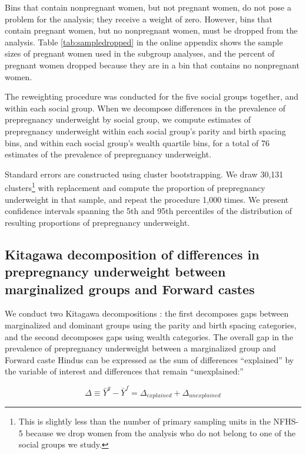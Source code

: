 \documentclass[12pt]{article}
\begin{document}
Bins that contain nonpregnant women, but not pregnant women, do not pose a problem for the analysis; they receive a weight of zero.  However, bins that contain pregnant women, but no nonpregnant women, must be dropped from the analysis. Table \ref{tab:sampledropped} in the online appendix shows the sample sizes of pregnant women used in the subgroup analyses, and the percent of pregnant women dropped because they are in a bin that contains no nonpregnant women.  

The reweighting procedure was conducted for the five social groups together, and within each social group.  When we decompose differences in the prevalence of prepregnancy underweight by social group, we compute estimates of prepregnancy underweight within each social group's parity and birth spacing bins, and within each social group's wealth quartile bins, for a total of 76 estimates of the prevalence of prepregnancy underweight.  

Standard errors are constructed using cluster bootstrapping.  We draw 30,131 clusters\footnote{This is slightly less than the number of primary sampling units in the NFHS-5 because we drop women from the analysis who do not belong to one of the social groups we study.} with replacement and compute the proportion of prepregnancy underweight in that sample, and repeat the procedure 1,000 times.  We present confidence intervals spanning the 5th and 95th percentiles of the distribution of resulting proportions of prepregnancy underweight.

\subsection{Kitagawa decomposition of differences in prepregnancy underweight between marginalized groups and Forward castes}

We conduct two Kitagawa decompositions \citep{kitagawa1955components}: the first decomposes gaps between marginalized and dominant groups using the parity and birth spacing categories, and the second decomposes gaps using wealth categories.  The overall gap in the prevalence of prepregnancy underweight between a marginalized group and Forward caste Hindus can be expressed as the sum of differences ``explained'' by the variable of interest and differences that remain ``unexplained:''

\begin{equation}
\label{eq:kitagawa}
\Delta \equiv \bar Y^{g} - \bar Y^{f}
= \Delta_{explained} + \Delta_{unexplained}
\end{equation}
\end{document}
